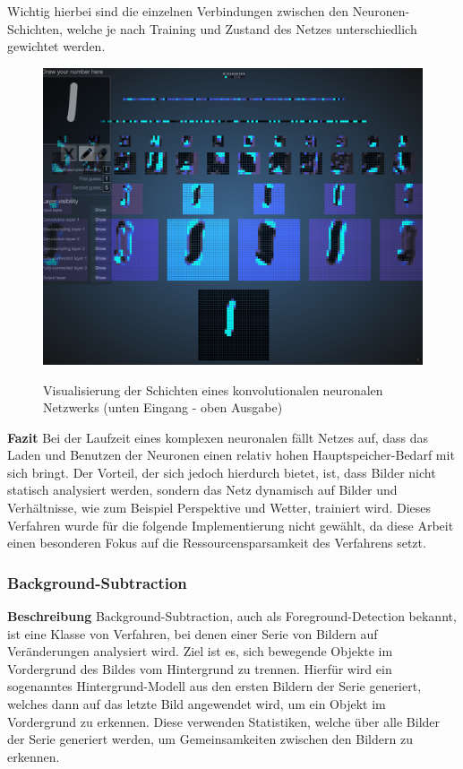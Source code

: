 Wichtig hierbei sind die einzelnen Verbindungen zwischen den Neuronen-Schichten, welche je nach Training und Zustand des Netzes unterschiedlich gewichtet werden.
\begin{figure}[ht]
   \centering
     \includegraphics[width=15cm]{Bilder/cnn-visualized} \\
 \caption{Visualisierung der Schichten eines konvolutionalen neuronalen Netzwerks (unten Eingang - oben Ausgabe)}
 \label{fig:CNN}
\end{figure}
\newline\newline
\textbf{Fazit}\newline
Bei der Laufzeit eines komplexen neuronalen fällt Netzes auf, dass das Laden und Benutzen der Neuronen einen relativ hohen Hauptspeicher-Bedarf mit sich bringt.
Der Vorteil, der sich jedoch hierdurch bietet, ist, dass Bilder nicht statisch analysiert werden, sondern das Netz dynamisch auf Bilder und Verhältnisse, wie zum Beispiel Perspektive und Wetter, trainiert wird.
Dieses Verfahren wurde für die folgende Implementierung nicht gewählt, da diese Arbeit einen besonderen Fokus auf die Ressourcensparsamkeit des Verfahrens setzt.
\newpage

\subsubsection{Background-Subtraction}
\label{sec:backsub-algo}
\textbf{Beschreibung}\newline
Background-Subtraction, auch als Foreground-Detection bekannt, ist eine Klasse von Verfahren, bei denen einer Serie von Bildern auf Veränderungen analysiert wird.
Ziel ist es, sich bewegende Objekte im Vordergrund des Bildes vom Hintergrund zu trennen.
Hierfür wird ein sogenanntes Hintergrund-Modell aus den ersten Bildern der Serie generiert, welches dann auf das letzte Bild angewendet wird, um ein Objekt im Vordergrund zu erkennen. 
Diese verwenden Statistiken, welche über alle Bilder der Serie generiert werden, um Gemeinsamkeiten zwischen den Bildern zu erkennen.


